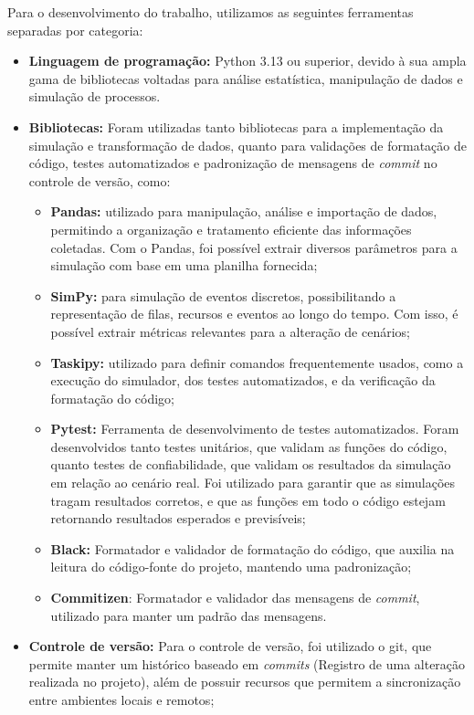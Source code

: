 \documentclass[
    12pt,
    openright,
    oneside,
    a4paper,
    english,
    brazil
]{abntex2}
\begin{document}
Para o desenvolvimento do trabalho, utilizamos as seguintes ferramentas separadas por categoria:
\begin{itemize}
		\item \textbf{Linguagem de programação:} Python 3.13 ou superior, devido à sua ampla gama de bibliotecas voltadas para análise estatística, manipulação de dados e simulação de processos.
		\item \textbf{Bibliotecas:} Foram utilizadas tanto bibliotecas para a implementação da simulação e transformação de dados, quanto para validações de formatação de código, testes automatizados e padronização de mensagens de \textit{commit} no controle de versão, como:
		\begin{itemize}
			\item \textbf{Pandas:} utilizado para manipulação, análise e importação de dados, permitindo a organização e tratamento eficiente das informações coletadas. Com o Pandas, foi possível extrair diversos parâmetros para a simulação com base em uma planilha fornecida;
			\item \textbf{SimPy:} para simulação de eventos discretos, possibilitando a representação de filas, recursos e eventos ao longo do tempo. Com isso, é possível extrair métricas relevantes para a alteração de cenários;
			\item \textbf{Taskipy:} utilizado para definir comandos frequentemente usados, como a execução do simulador, dos testes automatizados, e da verificação da formatação do código;
			\item \textbf{Pytest:} Ferramenta de desenvolvimento de testes automatizados. Foram desenvolvidos tanto testes unitários, que validam as funções do código, quanto testes de confiabilidade, que validam os resultados da simulação em relação ao cenário real. Foi utilizado para garantir que as simulações tragam resultados corretos, e que as funções em todo o código estejam retornando resultados esperados e previsíveis;
			\item \textbf{Black:} Formatador e validador de formatação do código, que auxilia na leitura do código-fonte do projeto, mantendo uma padronização;
			\item \textbf{Commitizen}: Formatador e validador das mensagens de \textit{commit}, utilizado para manter um padrão das mensagens.
		\end{itemize}
		\item \textbf{Controle de versão:} Para o controle de versão, foi utilizado o git, que permite manter um histórico baseado em \textit{commits} (Registro de uma alteração realizada no projeto), além de possuir recursos que permitem a sincronização entre ambientes locais e remotos;

\end{itemize}
\end{document}

